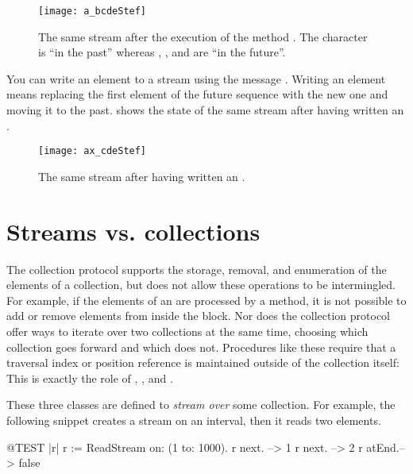 \documentclass[a4paper,10pt,twoside]{book}
\begin{document}
\begin{figure}[ht]
\centerline{\texttt{[image: a\_bcdeStef]}}
\caption{The same stream after the execution of the method .
The character  is ``in the past'' whereas , ,  and  are ``in the future''.}
\label{fig:a_bcde}
\vspace{.2in}
\end{figure}

You can write an element to a stream using the message  . Writing an element means replacing the first element of the future sequence with the new one and moving it to the past.
 shows the state of the same stream after having written an .

\begin{figure}[h!t]
\centerline{\texttt{[image: ax\_cdeStef]}}
\caption{The same stream after having written an .}
\label{fig:ax_cde}
\vspace{.2in}
\end{figure}

\section{Streams vs. collections}

The collection protocol supports the storage, removal, and enumeration of the elements of a collection, but does not allow these operations
to be intermingled.
For example, if the elements of an  are processed by a  method, it is not
possible to add or remove elements from inside the  block.
Nor does the collection protocol offer ways to iterate over two collections at the same time, choosing which collection goes forward
and which does not.
Procedures like these require that a traversal index or position reference is maintained outside of the collection itself:
This is exactly the role of , , and .

These three classes are defined to \emph{stream over} some collection.
For example, the following snippet creates a stream on an interval, then it reads two elements.
\begin{code}{@TEST |r|}
r := ReadStream on: (1 to: 1000).
r next.   --> 1
r next.   --> 2
r atEnd.--> false
\end{code}
\end{document}
